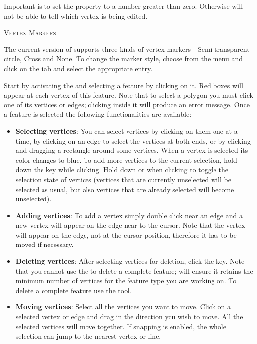 Important is to set the property  \arrow
{} \arrow
{} \arrow {} to a number greater than
zero. Otherwise \qg will not be able to tell which vertex is being edited.

\begin{Tip}\caption{\textsc{Vertex Markers}}
The current version of \qg supports three kinds of vertex-markers -
Semi transparent circle, Cross and None. To change the marker style, choose
 from the  menu
and click on the  tab and select the appropriate entry.
\end{Tip}


Start by activating the  and selecting
a feature by clicking on it. Red boxes will appear at each vertex of this feature.
Note that to select a polygon you must click one of its vertices or edges;
clicking inside it will produce an error message. Once a feature
is selected the following functionalities are available:

\begin{itemize}[label=--]
\item \textbf{Selecting vertices}: You can select vertices by clicking on them
one at a time, by clicking on an edge to select the vertices at both ends, or
by clicking and dragging a rectangle around some vertices.  When a vertex is
selected its color changes to blue. To add more vertices to the current selection,
hold down the  key while clicking. Hold down
 or  when clicking to toggle the selection state of
vertices (vertices that are currently unselected will be selected as usual, but
also vertices that are already selected will become unselected).
\item \textbf{Adding vertices}: To add a vertex simply double click near
an edge and a new vertex will appear on the edge near to the cursor. Note that
the vertex will appear on the edge, not at the cursor position, therefore it has
to be moved if necessary.
\item \textbf{Deleting vertices}: After selecting vertices for deletion, click the
 key. Note that you cannot use the
 to delete a complete feature; \qg will
ensure it retains the minimum number of vertices for the feature type you are
working on. To delete a complete feature use the
 tool.
\item \textbf{Moving vertices}: Select all the vertices you want to move. Click
on a selected vertex or edge and drag in the direction you wish to move. All the
selected vertices will move together. If snapping is enabled,
the whole selection can jump to the nearest vertex or line.
\end{itemize}

